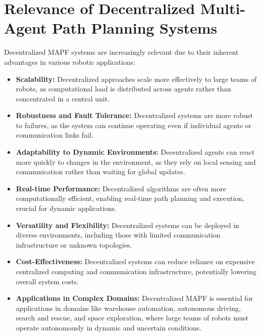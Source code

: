 \section{Relevance of Decentralized Multi-Agent Path Planning Systems}
Decentralized MAPF systems are increasingly relevant due to their inherent advantages in various robotic applications:
\begin{itemize}
    \item \textbf{Scalability:} Decentralized approaches scale more effectively to large teams of robots, as computational load is distributed across agents rather than concentrated in a central unit.
    \item \textbf{Robustness and Fault Tolerance:} Decentralized systems are more robust to failures, as the system can continue operating even if individual agents or communication links fail.
    \item \textbf{Adaptability to Dynamic Environments:} Decentralized agents can react more quickly to changes in the environment, as they rely on local sensing and communication rather than waiting for global updates.
    \item \textbf{Real-time Performance:} Decentralized algorithms are often more computationally efficient, enabling real-time path planning and execution, crucial for dynamic applications.
    \item \textbf{Versatility and Flexibility:} Decentralized systems can be deployed in diverse environments, including those with limited communication infrastructure or unknown topologies.
    \item \textbf{Cost-Effectiveness:} Decentralized systems can reduce reliance on expensive centralized computing and communication infrastructure, potentially lowering overall system costs.
    \item \textbf{Applications in Complex Domains:} Decentralized MAPF is essential for applications in domains like warehouse automation, autonomous driving, search and rescue, and space exploration, where large teams of robots must operate autonomously in dynamic and uncertain conditions.
\end{itemize}

